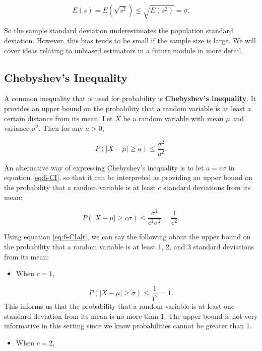 \documentclass[
]{book}
\providecommand{\tightlist}{%
  \setlength{\itemsep}{0pt}\setlength{\parskip}{0pt}}
\begin{document}
\[
E(s) = E(\sqrt{s^2}) \leq \sqrt{E(s^2)} = \sigma.
\]

So the sample standard deviation underestimates the population standard deviation. However, this bias tends to be small if the sample size is large. We will cover ideas relating to unbiased estimators in a future module in more detail.

\hypertarget{chebyshevs-inequality}{%
\subsection{Chebyshev's Inequality}\label{chebyshevs-inequality}}

A common inequality that is used for probability is \textbf{Chebyshev's inequality}. It provides an upper bound on the probability that a random variable is at least a certain distance from its mean. Let \(X\) be a random variable with mean \(\mu\) and variance \(\sigma^2\). Then for any \(a>0\),

\begin{equation} 
P(|X-\mu| \geq a) \leq \frac{\sigma^2}{a^2}.
\label{eq:6-CI}
\end{equation}

An alternative way of expressing Chebyshev's inequality is to let \(a = c \sigma\) in equation \eqref{eq:6-CI}, so that it can be interpreted as providing an upper bound on the probability that a random variable is at least \(c\) standard deviations from its mean:

\begin{equation} 
P(|X-\mu| \geq c \sigma) \leq \frac{\sigma^2}{c^2 \sigma^2} = \frac{1}{c^2}.
\label{eq:6-CIalt}
\end{equation}

Using equation \eqref{eq:6-CIalt}, we can say the following about the upper bound on the probability that a random variable is at least 1, 2, and 3 standard deviations from its mean:

\begin{itemize}
\tightlist
\item
  When \(c=1\),
\end{itemize}

\[
P(|X-\mu| \geq \sigma) \leq \frac{1}{1^2} = 1.
\]
This informs us that the probability that a random variable is at least one standard deviation from its mean is no more than 1. The upper bound is not very informative in this setting since we know probabilities cannot be greater than 1.

\begin{itemize}
\tightlist
\item
  When \(c=2\),
\end{itemize}
\end{document}
